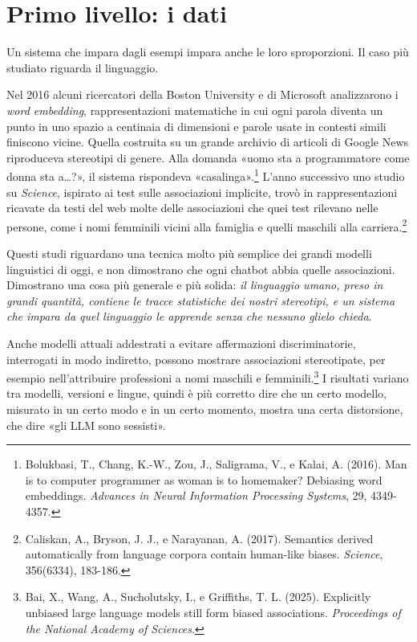 
\section{Primo livello: i dati}

Un sistema che impara dagli esempi impara anche le loro sproporzioni. Il caso più studiato riguarda il linguaggio.

Nel 2016 alcuni ricercatori della Boston University e di Microsoft analizzarono i \textit{word embedding}, rappresentazioni matematiche in cui ogni parola diventa un punto in uno spazio a centinaia di dimensioni e parole usate in contesti simili finiscono vicine. Quella costruita su un grande archivio di articoli di Google News riproduceva stereotipi di genere. Alla domanda «uomo sta a programmatore come donna sta a…?», il sistema rispondeva «casalinga».\footnote{Bolukbasi, T., Chang, K.-W., Zou, J., Saligrama, V., e Kalai, A. (2016). Man is to computer programmer as woman is to homemaker? Debiasing word embeddings. \textit{Advances in Neural Information Processing Systems}, 29, 4349-4357.} L'anno successivo uno studio su \textit{Science}, ispirato ai test sulle associazioni implicite, trovò in rappresentazioni ricavate da testi del web molte delle associazioni che quei test rilevano nelle persone, come i nomi femminili vicini alla famiglia e quelli maschili alla carriera.\footnote{Caliskan, A., Bryson, J. J., e Narayanan, A. (2017). Semantics derived automatically from language corpora contain human-like biases. \textit{Science}, 356(6334), 183-186.}

Questi studi riguardano una tecnica molto più semplice dei grandi modelli linguistici di oggi, e non dimostrano che ogni chatbot abbia quelle associazioni. Dimostrano una cosa più generale e più solida: \textit{il linguaggio umano, preso in grandi quantità, contiene le tracce statistiche dei nostri stereotipi, e un sistema che impara da quel linguaggio le apprende senza che nessuno glielo chieda}.

Anche modelli attuali addestrati a evitare affermazioni discriminatorie, interrogati in modo indiretto, possono mostrare associazioni stereotipate, per esempio nell'attribuire professioni a nomi maschili e femminili.\footnote{Bai, X., Wang, A., Sucholutsky, I., e Griffiths, T. L. (2025). Explicitly unbiased large language models still form biased associations. \textit{Proceedings of the National Academy of Sciences}.} I risultati variano tra modelli, versioni e lingue, quindi è più corretto dire che un certo modello, misurato in un certo modo e in un certo momento, mostra una certa distorsione, che dire «gli LLM sono sessisti».

